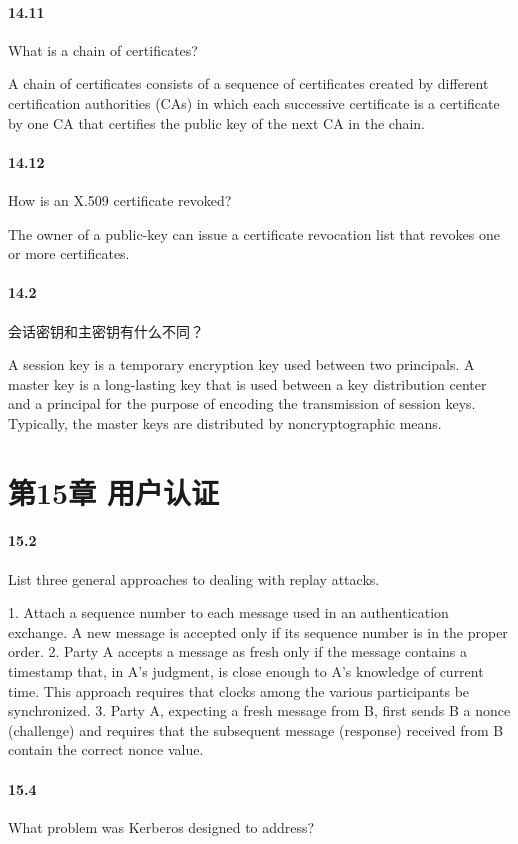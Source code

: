 \documentclass[UTF8]{article}
\begin{document}
\paragraph{14.11}
What is a chain of certificates?

A chain of certificates consists of a sequence of certificates created by different certification authorities (CAs) in which each successive certificate is a certificate by one CA that certifies the public key of the next CA in the chain.
\paragraph{14.12}
How is an X.509 certificate revoked?

The owner of a public-key can issue a certificate revocation list that revokes one or more certificates.
\paragraph{14.2}
会话密钥和主密钥有什么不同？

A session key is a temporary encryption key used between two principals. A master key is a long-lasting key that is used between a key distribution center and a principal for the purpose of encoding the transmission of session keys. Typically, the master keys are distributed by noncryptographic means.
\section{第15章 用户认证}
\paragraph{15.2}
List three general approaches to dealing with replay attacks.

1. Attach a sequence number to each message used in an authentication exchange. A new message is accepted only if its sequence number is in the proper order. 2. Party A accepts a message as fresh only if the message contains a timestamp that, in A's judgment, is close enough to A's knowledge of current time. This approach requires that clocks among the various participants be synchronized. 3. Party A, expecting a fresh message from B, first sends B a nonce (challenge) and requires that the subsequent message (response) received from B contain the correct nonce value.
\paragraph{15.4}
What problem was Kerberos designed to address?
\end{document}
